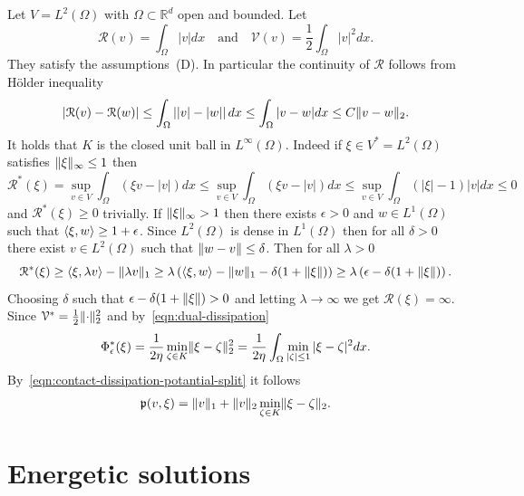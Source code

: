 \documentclass[letterpaper,oneside]{amsart}
\numberwithin{equation}{section}
\theoremstyle{definition}
\DeclarePairedDelimiter{\norm}{\lVert}{\rVert}
\DeclarePairedDelimiter{\dual}{\langle}{\rangle}
\begin{document}
Let $V=L^2(\Omega)$ with $\Omega\subset\mathbb{R}^d$ open and bounded. Let
\begin{equation*}
\mathcal{R}(v)=\int_\Omega|v|dx\quad\text{and}\quad\mathcal{V}(v)=\frac{1}{2}\int_\Omega|v|^2dx.
\end{equation*}
They satisfy the assumptions~(D). In particular the continuity of $\mathcal{R}$ follows from H\"older inequality
\begin{equation*}
|\mathcal{R}(v)-\mathcal{R}(w)|\le\int_\Omega\left||v|-|w|\right|dx\le\int_\Omega|v-w|dx\le C\norm{v-w}_2.
\end{equation*}
It holds that $K$ is the closed unit ball in $L^\infty(\Omega)$. Indeed if $\xi\in V^*=L^2(\Omega)$ satisfies $\norm{\xi}_\infty\le1$ then
\begin{equation*}
\mathcal{R}^*(\xi)=\sup_{v\in V}\int_\Omega\left(\xi v-|v|\right)dx\le\sup_{v\in V}\int_\Omega\left(\xi v-|v|\right)dx\le\sup_{v\in V}\int_\Omega(|\xi|-1)|v|dx\le0
\end{equation*}
and $\mathcal{R}^*(\xi)\ge0$ trivially. If $\norm{\xi}_\infty>1$ then there exists $\epsilon>0$ and $w\in L^1(\Omega)$ such that $\dual{\xi,w}\ge1+\epsilon$. Since $L^2(\Omega)$ is dense in $L^1(\Omega)$ then for all $\delta>0$ there exist $v\in L^2(\Omega)$ such that $\norm{w-v}\le\delta$. Then for all $\lambda>0$
\begin{equation*}
\mathcal{R}^*(\xi)\ge\dual{\xi,\lambda v}-\norm{\lambda v}_1\ge\lambda\left(\dual{\xi,w}-\norm{w}_1-\delta(1+\norm{\xi})\right)\ge\lambda\left(\epsilon-\delta(1+\norm{\xi})\right).
\end{equation*}
Choosing $\delta$ such that $\epsilon-\delta(1+\norm{\xi})>0$ and letting $\lambda\to\infty$ we get $\mathcal{R}(\xi)=\infty$. Since $\mathcal{V}^*=\frac{1}{2}\norm{\cdot}_2^2$ and by~\eqref{eqn:dual-dissipation}
\begin{equation*}
\Phi_\epsilon^*(\xi)=\frac{1}{2\eta}\min_{\zeta\in K}\norm{\xi-\zeta}_2^2=\frac{1}{2\eta}\int_\Omega\min_{|\zeta|\le1}|\xi-\zeta|^2dx.
\end{equation*}
By~\eqref{eqn:contact-dissipation-potantial-split} it follows
\begin{equation*}
\mathfrak{p}(v,\xi)=\norm{v}_1+\norm{v}_2\min_{\zeta\in K}\norm{\xi-\zeta}_2.
\end{equation*}

\section{Energetic solutions}
\end{document}

